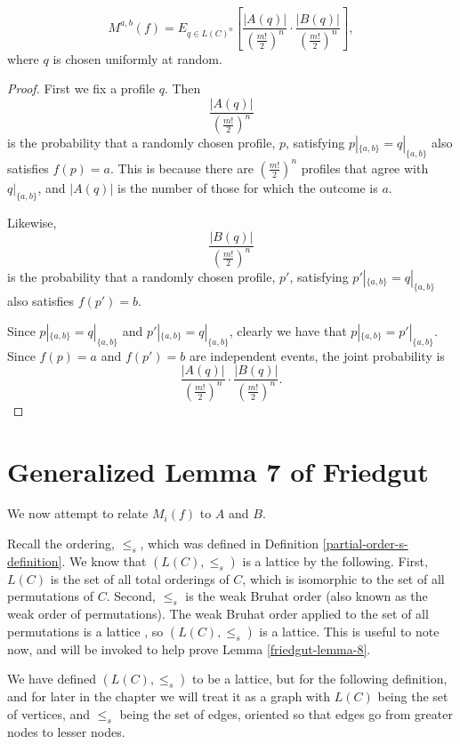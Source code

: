 	\begin{lemma}
		\label{friedgut-lemma-6}
		\[
			M^{a,b}(f) = E_{q \in L(C)^n} \left[ \frac{|A(q)|}{\left(\frac{m!}{2}\right)^n} \cdot \frac{|B(q)|}{\left(\frac{m!}{2}\right)^n} \right],
		\]
		where $q$ is chosen uniformly at random.
	\end{lemma}
	\begin{proof}
		First we fix a profile $q$. Then
		\[
			\frac{|A(q)|}{\left(\frac{m!}{2}\right)^n}
		\]
		is the probability that a randomly chosen profile, $p$, satisfying $p|_{\{a,b\}} = q|_{\{a,b\}}$ also satisfies $f(p) = a$. This is because there are $(\frac{m!}{2})^n$ profiles that agree with $q|_{\{a,b\}}$, and $|A(q)|$ is the number of those for which the outcome is $a$.

		Likewise,
		\[
			\frac{|B(q)|}{\left(\frac{m!}{2}\right)^n}
		\]
		is the probability that a randomly chosen profile, $p'$, satisfying $p'|_{\{a,b\}} = q|_{\{a,b\}}$ also satisfies $f(p') = b$.

		Since $p|_{\{a,b\}} = q|_{\{a,b\}}$ and $p'|_{\{a,b\}} = q|_{\{a,b\}}$, clearly we have that $p|_{\{a,b\}} = p'|_{\{a,b\}}$. Since $f(p) = a$ and $f(p') = b$ are independent events, the joint probability is
		\[
			\frac{|A(q)|}{\left(\frac{m!}{2}\right)^n} \cdot \frac{|B(q)|}{\left(\frac{m!}{2}\right)^n}.
		\]
	\end{proof}


\section{Generalized Lemma 7 of Friedgut}

	We now attempt to relate $M_i(f)$ to $A$ and $B$.

	Recall the ordering, $\le_s$, which was defined in Definition \ref{partial-order-s-definition}. We know that $(L(C), \le_s)$ is a lattice by the following. First, $L(C)$ is the set of all total orderings of $C$, which is isomorphic to the set of all permutations of $C$. Second, $\le_s$ is the weak Bruhat order (also known as the weak order of permutations). The weak Bruhat order applied to the set of all permutations is a lattice \cite{bjorner1984orderings}, so $(L(C), \le_s)$ is a lattice. This is useful to note now, and will be invoked to help prove Lemma \ref{friedgut-lemma-8}.

	We have defined $(L(C), \le_s)$ to be a lattice, but for the following definition, and for later in the chapter we will treat it as a graph with $L(C)$ being the set of vertices, and $\le_s$ being the set of edges, oriented so that edges go from greater nodes to lesser nodes.

